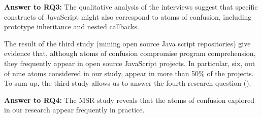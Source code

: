 \begin{mh}
  {\bf Answer to RQ3:} The qualitative analysis of the
  interviews suggest that specific constructs of
  JavaScript might also correspond to atoms of
  confusion, including prototype inheritance and
  nested callbacks. 
\end{mh}

The result of the third study (mining open source
Java script repositories) give evidence that,
although atoms of confusion compromise program
comprehension, they frequently appear in open
source JavaScript projects. In particular,
{\color{red}six, out of nine atoms considered
  in our study,} appear in more than 50\% of
the projects. To sum up, the third study
allows us to answer the fourth research
question (\emph{\rqd}).


\begin{mh}
  {\bf Answer to RQ4:} The MSR study reveals that
  the atoms of confusion explored in our research
  appear frequently in practice. 
\end{mh}






